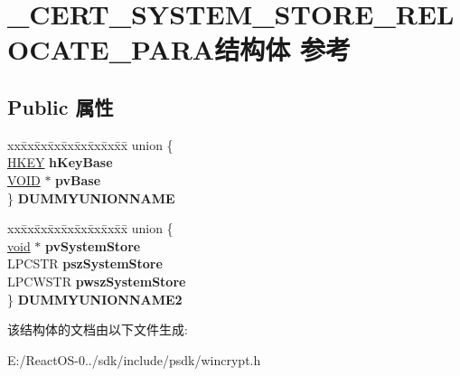 \hypertarget{struct___c_e_r_t___s_y_s_t_e_m___s_t_o_r_e___r_e_l_o_c_a_t_e___p_a_r_a}{}\section{\+\_\+\+C\+E\+R\+T\+\_\+\+S\+Y\+S\+T\+E\+M\+\_\+\+S\+T\+O\+R\+E\+\_\+\+R\+E\+L\+O\+C\+A\+T\+E\+\_\+\+P\+A\+R\+A结构体 参考}
\label{struct___c_e_r_t___s_y_s_t_e_m___s_t_o_r_e___r_e_l_o_c_a_t_e___p_a_r_a}
\subsection*{Public 属性}
\begin{DoxyCompactItemize}
\item 
\mbox{\label{struct___c_e_r_t___s_y_s_t_e_m___s_t_o_r_e___r_e_l_o_c_a_t_e___p_a_r_a_a138605e0b14395570dd8b6a1305476ac}} 
\begin{tabbing}
xx\=xx\=xx\=xx\=xx\=xx\=xx\=xx\=xx\=\kill
union \{\\
\>\hyperlink{interfacevoid}{HKEY} {\bfseries hKeyBase}\\
\>\hyperlink{interfacevoid}{VOID} $\ast$ {\bfseries pvBase}\\
\} {\bfseries DUMMYUNIONNAME}\\

\end{tabbing}\item 
\mbox{\label{struct___c_e_r_t___s_y_s_t_e_m___s_t_o_r_e___r_e_l_o_c_a_t_e___p_a_r_a_ab2fbb743d551640777da73c26ef22dc7}} 
\begin{tabbing}
xx\=xx\=xx\=xx\=xx\=xx\=xx\=xx\=xx\=\kill
union \{\\
\>\hyperlink{interfacevoid}{void} $\ast$ {\bfseries pvSystemStore}\\
\>LPCSTR {\bfseries pszSystemStore}\\
\>LPCWSTR {\bfseries pwszSystemStore}\\
\} {\bfseries DUMMYUNIONNAME2}\\

\end{tabbing}\end{DoxyCompactItemize}


该结构体的文档由以下文件生成\+:\begin{DoxyCompactItemize}
\item 
E\+:/\+React\+O\+S-\/0../sdk/include/psdk/wincrypt.\+h\end{DoxyCompactItemize}
